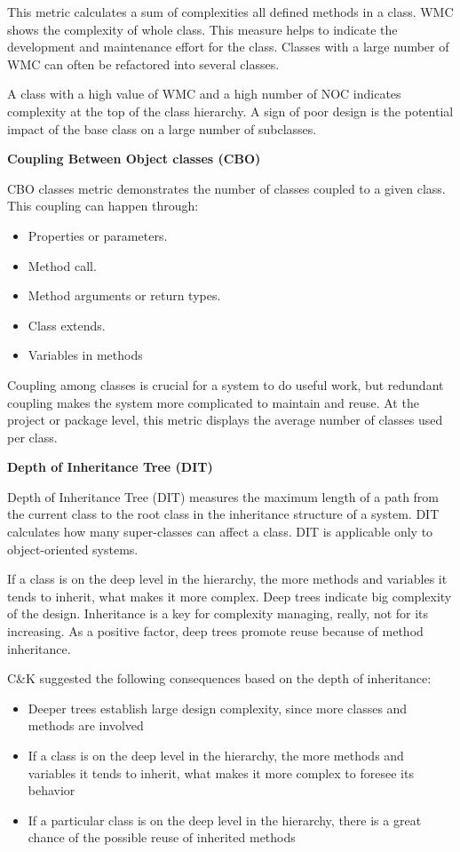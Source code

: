 This metric calculates a sum of complexities all defined methods in a class. WMC shows the complexity of whole class. This measure helps to indicate the development and maintenance effort for the class. Classes with a large number of WMC can often be refactored into several classes.

A class with a high value of WMC and a high number of NOC indicates complexity at the top of the class hierarchy. A sign of poor design is the potential impact of the base class on a large number of subclasses.

\textbf{Coupling Between Object classes (CBO)}

CBO classes metric demonstrates the number of classes coupled to a given class. This coupling can happen through:
\begin{itemize}
	\item Properties or parameters. 
	\item Method call. 
	\item Method arguments or return types.
	\item Class extends.
	\item Variables in methods
\end{itemize}

Coupling among classes is crucial for a system to do useful work, but redundant coupling makes the system more complicated to maintain and reuse. At the project or package level, this metric displays the average number of classes used per class.

\textbf{Depth of Inheritance Tree (DIT)}

Depth of Inheritance Tree (DIT) measures the maximum length of a path from the current class to the root class in the inheritance structure of a system. DIT calculates how many super-classes can affect a class. DIT is applicable only to object-oriented systems.

If a class is on the deep level in the hierarchy, the more methods and variables it tends to inherit, what makes it more complex. Deep trees indicate big complexity of the design. Inheritance is a key for complexity managing, really, not for its increasing. As a positive factor, deep trees promote reuse because of method inheritance.

C\&K suggested the following consequences based on the depth of inheritance:
\begin{itemize}
	\item Deeper trees establish large design complexity, since more classes and methods are involved
	\item If a class is on the deep level in the hierarchy, the more methods and variables it tends to inherit, what makes it more complex to foresee its behavior
	\item If a particular class is on the deep level in the hierarchy, there is a great chance of the possible reuse of inherited methods 
\end{itemize}

